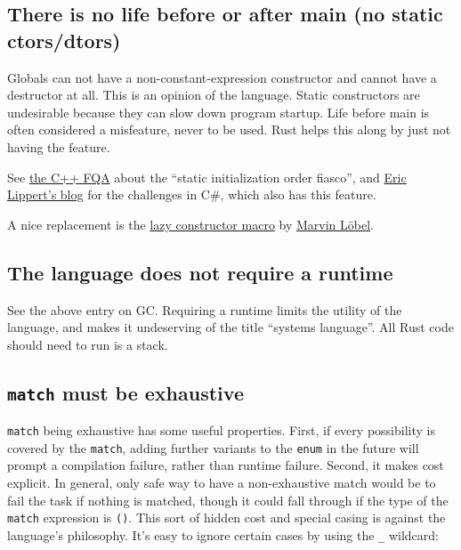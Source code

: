 \documentclass[]{article}
\begin{document}
\subsection{There is no life before or after main (no static
ctors/dtors)}\label{there-is-no-life-before-or-after-main-no-static-ctorsdtors}

Globals can not have a non-constant-expression constructor and cannot
have a destructor at all. This is an opinion of the language. Static
constructors are undesirable because they can slow down program startup.
Life before main is often considered a misfeature, never to be used.
Rust helps this along by just not having the feature.

See
\href{https://mail.mozilla.org/pipermail/rust-dev/2013-April/003815.html}{the
C++ FQA} about the ``static initialization order fiasco'', and
\href{http://ericlippert.com/2013/02/06/static-constructors-part-one/}{Eric
Lippert's blog} for the challenges in C\#, which also has this feature.

A nice replacement is the
\href{https://gist.github.com/Kimundi/8782487}{lazy constructor macro}
by \href{https://github.com/Kimundi}{Marvin Löbel}.

\subsection{The language does not require a
runtime}\label{the-language-does-not-require-a-runtime}

See the above entry on GC. Requiring a runtime limits the utility of the
language, and makes it undeserving of the title ``systems language''.
All Rust code should need to run is a stack.

\subsection{\texttt{match} must be
exhaustive}\label{match-must-be-exhaustive}

\texttt{match} being exhaustive has some useful properties. First, if
every possibility is covered by the \texttt{match}, adding further
variants to the \texttt{enum} in the future will prompt a compilation
failure, rather than runtime failure. Second, it makes cost explicit. In
general, only safe way to have a non-exhaustive match would be to fail
the task if nothing is matched, though it could fall through if the type
of the \texttt{match} expression is \texttt{()}. This sort of hidden
cost and special casing is against the language's philosophy. It's easy
to ignore certain cases by using the \texttt{\_} wildcard:
\end{document}
